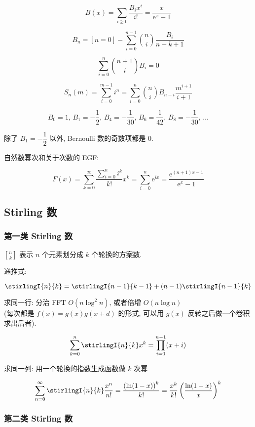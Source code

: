 \[
    B(x)=\sum_{i\ge 0}\frac{B_i x^i}{i!}=\frac x{\mathrm{e}^x-1}
\]

\[
    B_n=[n=0]-\sum_{i=0}^{n-1}\binom{n}{i}\frac{B_i}{n-k+1}
\]

\[
    \sum_{i=0}^n\binom{n+1}{i}B_i=0
\]

\[
    S_n(m)=\sum_{i=0}^{m-1}i^n=\sum_{i=0}^n\binom{n}{i}B_{n-i}\frac{m^{i+1}}{i+1}
\]

\[
    B_0 = 1, \, B_1 = -\frac{1}{2}, \, B_4 = -\frac{1}{30}, \, B_6 = \frac{1}{42}, \, B_8 = -\frac{1}{30}, \, \dots
\]

除了 \(B_1 = -\dfrac{1}{2}\) 以外, Bernoulli 数的奇数项都是 \(0\).

自然数幂次和关于次数的 EGF:

\[
    F(x)=\sum_{k=0}^\infty \frac{\sum_{i=0}^n i^k}{k!}x^k=\sum_{i=0}^n \mathrm{e}^{ix}=\frac{\mathrm{e}^{(n+1)x-1}}{\mathrm{e}^x-1}
\]

\subsection{Stirling 数}
\label{sec:stirling-数}

\subsubsection{第一类 Stirling 数}
\label{ssec:第一类-stirling-数}

\(n\brack k\) 表示 \(n\) 个元素划分成 \(k\) 个轮换的方案数.

递推式:

\[
    \stirlingI{n}{k} = \stirlingI{n-1}{k-1} + (n-1)\stirlingI{n-1}{k}
\]

求同一行: 分治 FFT \(O(n\log ^2 n)\), 或者倍增 \(O(n\log n)\) \\(每次都是 \(f(x) = g(x) g(x + d)\) 的形式, 可以用 \(g(x)\) 反转之后做一个卷积求出后者).

\[
    \sum_{k = 0}^n \stirlingI{n}{k} x^k = \prod_{i = 0}^{n - 1} (x + i)
\]

求同一列: 用一个轮换的指数生成函数做 \(k\) 次幂

\[
    \sum_{n = 0}^\infty \stirlingI{n}{k} \frac{x^n}{n!} = \frac{\left(\ln (1 - x)\right)^k}{k!} = \frac{x^k}{k!} \left( \frac{\ln (1 - x)}{x} \right)^k
\]

\subsubsection{第二类 Stirling 数}
\label{ssec:第二类-stirling-数}


